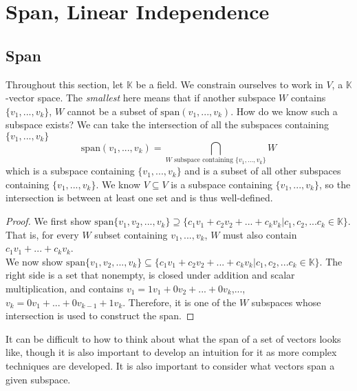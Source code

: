 \section{Span, Linear Independence}
\subsection{Span}
Throughout this section, let $\mathbb{K}$ be a field. We constrain ourselves to work in $V$, a $\mathbb{K}$-vector space.
The \textit{smallest} here means that if another subspace $W$ contains $\{v_1,...,v_k\}$, $W$ cannot be a subset of $\textrm{span}(v_1,...,v_k)$. How do we know such a subspace exists? We can take the intersection of all the subspaces containing $\{v_1,...,v_k\}$ \[
\textrm{span}(v_1,...,v_k) = \bigcap_{W \textrm{ subspace containing } \{v_1,...,v_k\}} W
\]
which is a subspace containing $\{v_1,...,v_k\}$ and is a subset of all other subspaces containing $\{v_1,...,v_k\}$. We know $V\subseteq V$ is a subspace containing $\{v_1,...,v_k\}$, so the intersection is between at least one set and is thus well-defined.
\begin{proof}
	We first show $\textrm{span}\{v_1, v_2, ... , v_k\} \supseteq \{c_1v_1 + c_2v_2 + ... + c_kv_k | c_1, c_2, ... c_k \in \mathbb{K}\}$. That is, for every $W$ subset containing $v_1,...,v_k$, $W$ must also contain $c_1v_1+...+c_kv_k$. \\
	We now show $\textrm{span}\{v_1, v_2, ... , v_k\} \subseteq \{c_1v_1 + c_2v_2 + ... + c_kv_k | c_1, c_2, ... c_k \in \mathbb{K}\}$. The right side is a set that nonempty, is closed under addition and scalar multiplication, and contains $v_1= 1v_1+0v_2+...+0v_k$,...,$v_k=0v_1+...+0v_{k-1}+1v_k$. Therefore, it is one of the $W$ subspaces whose intersection is used to construct the span.
\end{proof}


It can be difficult to how to think about what the span of a set of vectors looks like, though it is also important to develop
an intuition for it as more complex techniques are developed. It is also important to consider what vectors span a given subspace.

